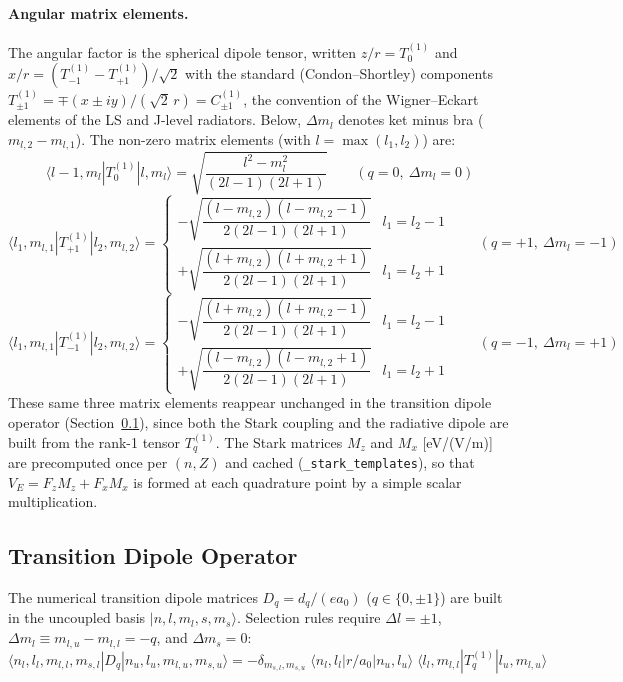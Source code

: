\documentclass[11pt,a4paper]{article}
\numberwithin{equation}{section}
\begin{document}
\paragraph{Angular matrix elements.}
The angular factor is the spherical dipole tensor, written $z/r = T_0^{(1)}$ and $x/r = (T_{-1}^{(1)} - T_{+1}^{(1)})/\sqrt{2}$ with the standard (Condon--Shortley) components $T_{\pm1}^{(1)} = \mp(x \pm iy)/(\sqrt{2}\,r) = C^{(1)}_{\pm1}$, the convention of the Wigner--Eckart elements of the LS and J-level radiators. Below, $\Delta m_l$ denotes ket minus bra ($m_{l,2}-m_{l,1}$). The non-zero matrix elements (with $l = \max(l_1, l_2)$) are:
\begin{equation}
\label{eq:Tq0}
\langle l-1, m_l | T_0^{(1)} | l, m_l \rangle
= \sqrt{\dfrac{l^2 - m_l^2}{(2l-1)(2l+1)}} \qquad (q=0,\ \Delta m_l = 0)
\end{equation}
\begin{equation}
\label{eq:Tqp1}
\langle l_1, m_{l,1} | T_{+1}^{(1)} | l_2, m_{l,2} \rangle =
\begin{cases}
-\sqrt{\dfrac{(l - m_{l,2})(l - m_{l,2} - 1)}{2(2l-1)(2l+1)}} & l_1 = l_2 - 1 \\[8pt]
+\sqrt{\dfrac{(l + m_{l,2})(l + m_{l,2} + 1)}{2(2l-1)(2l+1)}} & l_1 = l_2 + 1
\end{cases}
\qquad (q=+1,\ \Delta m_l = -1)
\end{equation}
\begin{equation}
\label{eq:Tqm1}
\langle l_1, m_{l,1} | T_{-1}^{(1)} | l_2, m_{l,2} \rangle =
\begin{cases}
-\sqrt{\dfrac{(l + m_{l,2})(l + m_{l,2} - 1)}{2(2l-1)(2l+1)}} & l_1 = l_2 - 1 \\[8pt]
+\sqrt{\dfrac{(l - m_{l,2})(l - m_{l,2} + 1)}{2(2l-1)(2l+1)}} & l_1 = l_2 + 1
\end{cases}
\qquad (q=-1,\ \Delta m_l = +1)
\end{equation}
These same three matrix elements reappear unchanged in the transition dipole operator (Section~\ref{sec:dipole_operator}), since both the Stark coupling and the radiative dipole are built from the rank-1 tensor $T_q^{(1)}$. The Stark matrices $M_z$ and $M_x$ [eV/(V/m)] are precomputed once per $(n, Z)$ and cached (\texttt{\_stark\_templates}), so that $V_E = F_z M_z + F_x M_x$ is formed at each quadrature point by a simple scalar multiplication.

\subsection{Transition Dipole Operator}
\label{sec:dipole_operator}
The numerical transition dipole matrices $D_q=d_q/(ea_0)$ ($q \in \{0,\pm1\}$) are built in the uncoupled basis $|n, l, m_l, s, m_s\rangle$. Selection rules require $\Delta l = \pm 1$, $\Delta m_l \equiv m_{l,u} - m_{l,l} = -q$, and $\Delta m_s = 0$:
\begin{equation}
\langle n_l, l_l, m_{l,l}, m_{s,l} | D_q | n_u, l_u, m_{l,u}, m_{s,u} \rangle
= -\delta_{m_{s,l}, m_{s,u}}\;
  \langle n_l, l_l | r/a_0 | n_u, l_u \rangle\;
  \langle l_l, m_{l,l} | T_q^{(1)} | l_u, m_{l,u} \rangle
\end{equation}
\end{document}
